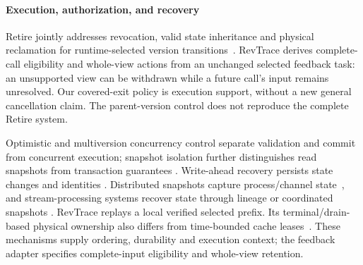 \paragraph{Execution, authorization, and recovery}
Retire jointly addresses revocation, valid state inheritance and physical
reclamation for runtime-selected version transitions~\cite{zhang2026retire}.
RevTrace derives complete-call eligibility and whole-view actions from
an unchanged selected feedback task: an unsupported view can be withdrawn
while a future call's input remains unresolved. Our covered-exit policy
is execution support, without a new general cancellation claim. The
parent-version control does not reproduce the complete Retire system.

Optimistic and multiversion concurrency control separate validation and
commit from concurrent execution; snapshot isolation further distinguishes
read snapshots from transaction guarantees
\cite{kung1981occ,bernstein1983mvcc,berenson1995isolation}.
Write-ahead recovery persists state changes and identities
\cite{mohan1992aries}. Distributed snapshots capture process/channel
state~\cite{chandy1985snapshots}, and stream-processing systems recover
state through lineage or coordinated snapshots
\cite{zaharia2013dstreams,carbone2017flinkstate}. RevTrace replays a local
verified selected prefix. Its terminal/drain-based physical ownership
also differs from time-bounded cache leases~\cite{gray1989leases}.
These mechanisms supply ordering, durability and execution context;
the feedback adapter specifies complete-input eligibility and whole-view
retention.
